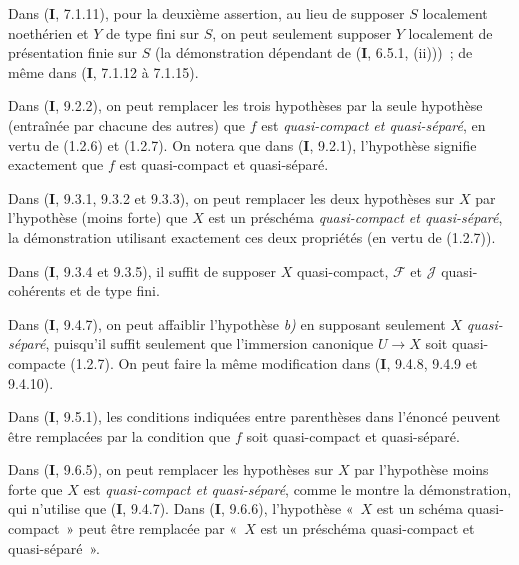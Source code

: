 \begin{env}[1.7.3]
\label{IV.1.7.3-fr}
Dans (\textbf{I}, 7.1.11), pour la deuxième assertion, au lieu de supposer $S$
localement noethérien et $Y$ de type fini sur $S$, on peut seulement supposer
$Y$ localement de présentation finie sur $S$ (la démonstration dépendant de
(\textbf{I}, 6.5.1, (ii)))~; de même dans (\textbf{I}, 7.1.12 à 7.1.15).
\end{env}

\begin{env}[1.7.4]
Dans (\textbf{I}, 9.2.2), on peut remplacer les trois hypothèses par la seule hypothèse
(entraînée par chacune des autres) que $f$ est \emph{quasi-compact et
quasi-séparé}, en vertu de (1.2.6) et (1.2.7). On notera que dans (\textbf{I}, 9.2.1),
l'hypothèse signifie exactement que $f$ est quasi-compact et quasi-séparé.
\end{env}

\begin{env}[1.7.5]
\label{IV.1.7.5-fr}
Dans (\textbf{I}, 9.3.1, 9.3.2 et 9.3.3), on peut remplacer les deux hypothèses sur $X$
par l'hypothèse (moins forte) que $X$ est un préschéma \emph{quasi-compact et
quasi-séparé}, la démonstration utilisant exactement ces deux propriétés (en
vertu de (1.2.7)).
\end{env}

\begin{env}[1.7.6]
\label{IV.1.7.6-fr}
Dans (\textbf{I}, 9.3.4 et 9.3.5), il suffit de supposer $X$ quasi-compact,
$\mathcal F$ et $\mathcal J$ quasi-cohérents et de type fini.
\end{env}

\begin{env}[1.7.7]
\label{IV.1.7.7-fr}
Dans (\textbf{I}, 9.4.7), on peut affaiblir l'hypothèse \emph{b)} en supposant seulement $X$
\emph{quasi-séparé}, puisqu'il suffit seulement que l'immersion canonique
$U\to X$ soit quasi-compacte (1.2.7). On peut faire la même modification dans
(\textbf{I}, 9.4.8, 9.4.9 et 9.4.10).
\end{env}

\begin{env}[1.7.8]
\label{IV.1.7.8-fr}
Dans (\textbf{I}, 9.5.1), les conditions indiquées entre parenthèses dans l'énoncé
peuvent être remplacées par la condition que $f$ soit quasi-compact et
quasi-séparé.
\end{env}

\begin{env}[1.7.9]
\label{IV.1.7.9-fr}
Dans (\textbf{I}, 9.6.5), on peut remplacer les hypothèses sur $X$ par l'hypothèse
moins forte que $X$ est \emph{quasi-compact et quasi-séparé}, comme le montre la
démonstration,
qui n'utilise que (\textbf{I}, 9.4.7). Dans (\textbf{I}, 9.6.6), l'hypothèse «~$X$ est un
schéma quasi-compact~» peut être remplacée par «~$X$ est un préschéma
quasi-compact et quasi-séparé~».
\end{env}


